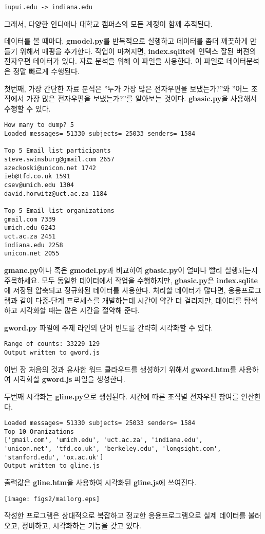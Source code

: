 \beforeverb
\begin{verbatim}
iupui.edu -> indiana.edu
\end{verbatim}
\afterverb
%

그래서, 다양한 인디애나 대학교 캠퍼스의 모든 계정이 함께 추적된다.

데이터를 볼 때마다, {\bf gmodel.py}를 반복적으로 실행하고 데이터를 좀더 깨끗하게 만들기 위해서 매핑을 추가한다. 
작업이 마쳐지면, {\bf index.sqlite}에 인덱스 잘된 버젼의 전자우편 데이터가 있다.
자료 분석을 위해 이 파일을 사용한다. 
이 파일로 데이터분석은 정말 빠르게 수행된다.

첫번째, 가장 간단한 자료 분석은 ''누가 가장 많은 전자우편을 보냈는가?''와 ''어느 조직에서 가장 많은 전자우편을 보냈는가?''를 알아보는 것이다. 
{\bf gbasic.py}을 사용해서 수행할 수 있다.

\beforeverb
\begin{verbatim}
How many to dump? 5
Loaded messages= 51330 subjects= 25033 senders= 1584

Top 5 Email list participants
steve.swinsburg@gmail.com 2657
azeckoski@unicon.net 1742
ieb@tfd.co.uk 1591
csev@umich.edu 1304
david.horwitz@uct.ac.za 1184

Top 5 Email list organizations
gmail.com 7339
umich.edu 6243
uct.ac.za 2451
indiana.edu 2258
unicon.net 2055
\end{verbatim}
\afterverb
%

{\bf gmane.py}이나 혹은 {\bf gmodel.py}과 비교하여 {\bf gbasic.py}이 얼마나 빨리 실행되는지 주목하세요.
모두 동일한 데이터에서 작업을 수행하지만, {\bf gbasic.py}은 {\bf index.sqlite}에 저장된 압축되고 정규화된 데이터를 사용한다. 
처리할 데이터가 많다면, 응용프로그램과 같이 다중-단계 프로세스를 개발하는데 시간이 약간 더 걸리지만, 데이터를 탐색하고 시각화할 때는 많은 시간을 절약해 준다. 

{\bf gword.py} 파일에 주제 라인의 단어 빈도를 간략히 시각화할 수 있다.

\beforeverb
\begin{verbatim}
Range of counts: 33229 129
Output written to gword.js
\end{verbatim}
\afterverb
%

이번 장 처음의 것과 유사한 워드 클라우드를 생성하기 위해서 {\bf gword.htm}를 사용하여 시각화할 {\bf gword.js} 파일을 생성한다.

두번째 시각화는 {\bf gline.py}으로 생성된다. 시간에 따른 조직별 전자우편 참여를 연산한다.

\beforeverb
\begin{verbatim}
Loaded messages= 51330 subjects= 25033 senders= 1584
Top 10 Oranizations
['gmail.com', 'umich.edu', 'uct.ac.za', 'indiana.edu', 
'unicon.net', 'tfd.co.uk', 'berkeley.edu', 'longsight.com', 
'stanford.edu', 'ox.ac.uk']
Output written to gline.js
\end{verbatim}
\afterverb
%

출력값은 {\bf gline.htm}을 사용하여 시각화된 {\bf gline.js}에 쓰여진다.

\beforefig
\centerline{\texttt{[image: figs2/mailorg.eps]}}
\afterfig

작성한 프로그램은 상대적으로 복잡하고 정교한 응용프로그램으로 실제 데이터를 불러오고, 정비하고, 시각화하는 기능을 갖고 있다.
